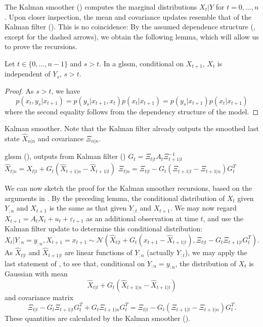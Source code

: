 The Kalman smoother () computes the marginal distributions $X_{t} | Y$ for $t = 0, \dots, n$. Upon closer inspection, the mean and covariance updates resemble that of the Kalman filter (). This is no coincidence: By the assumed dependence structure (, except for the dashed arrows), we obtain the following lemma, which will allow us to prove the recursions.
\begin{lemma}
    Let $t \in \{0, \dots, n - 1\}$ and $s > t$. In a \acrshort{glssm}, conditional on $X_{t + 1}$, $X_{t}$ is independent of $Y_{s}$, $s > t$. 
\end{lemma}
\begin{proof}
    As $s > t$, we have
    $$
    p(x_{t}, y_{s} | x_{t + 1}) = p(y_{s}| x_{t + 1}, x_{t}) p(x_{t} | x_{t + 1}) = p(y_{s} | x_{t + 1}) p(x_{t} | x_{t + 1})
    $$
    where the second equality follows from the dependency structure of the model. 
\end{proof}
\begin{algorithm}
    \caption{Kalman smoother. Note that the Kalman filter already outputs the smoothed last state $\hat X_{n|n}$ and covariance $\Xi_{n|n}$.}
    \label{alg:kalman_smoother}
    \begin{algorithmic}[1]
        \Require \acrshort{glssm} (), outputs from Kalman filter ()
            \State $G_{t} = \Xi_{t|t} A_{t}\Xi_{t+1|t}^{-1}$
            \State $\hat X_{t | n} = \hat X_{t|t} + G_{t} \left( \hat X_{t + 1|n} - \hat X_{t + 1|t} \right)$
            \State $\Xi_{t|n} = \Xi_{t|t} - G_{t} \left( \Xi_{t + 1|t} - \Xi_{t + 1|n} \right)G_{t}^T$
        \EndFor
    \end{algorithmic}
\end{algorithm}


We can now sketch the proof for the Kalman smoother recursions, based on the arguments in \citep[Chapter 7.3]{Chopin2020Introduction}. By the preceding lemma, the conditional distribution of $X_{t}$ given $Y_{:n}$ and $X_{t + 1}$ is the same as that given $Y_{:t}$ and $X_{t + 1}$. 
We may now regard $X_{t + 1} = A_{t}X_{t} + u_{t} + \varepsilon_{t + 1}$ as an additional observation at time $t$, and use the Kalman filter update to determine this conditional distribution:
$$
X_{t} | Y_{:n} = y_{:n}, X_{t + 1} = x_{t+1}\sim \mathcal N \left(\hat X_{t|t} + G_{t}(x_{t + 1} - \hat X_{t + 1 | t}), \Xi_{t |t} - G_{t} \Xi_{t + 1 | t} G_{t}^{T} \right).
$$
As $\hat X_{t|t}$ and $\hat X_{t+1|t}$ are linear functions of $Y_{:n}$ (actually $Y_{:t}$), we may apply the last statement of , to see that, conditional on $Y_{:n} = y_{:n}$, the distribution of $X_{t}$ is Gaussian with mean
$$
\hat X_{t|t} + G_{t} \left( \hat X_{t + 1 | n} - \hat X_{t + 1 | t} \right)
$$
and covariance matrix 
$$
\Xi_{t | t} - G_{t} \Xi_{t + 1|t} G_{t}^{T} + G_{t} \Xi_{t + 1 | n} G_{t}^{T} = \Xi_{t|t} - G_{t} \left( \Xi_{t + 1 | t} - \Xi_{t + 1 | n} \right)G_{t} ^{T}.
$$
These quantities are calculated by the Kalman smoother ().

